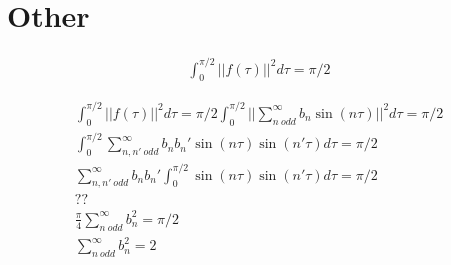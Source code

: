 
\section{Other}


\begin{gather}
    \int_0^{\pi/2} ||f(\tau) ||^2 d\tau = \pi/2
\end{gather}

\begin{gather}
    \int_0^{\pi/2} ||f(\tau) ||^2 d\tau = \pi/2
    \int_0^{\pi/2} || \sum_{n \ odd}^\infty b_n \sin(n\tau) ||^2 d\tau = \pi/2\\
    \int_0^{\pi/2}  \sum_{n,n' \ odd}^\infty b_n b_n' \sin(n\tau)\sin(n'\tau)  d\tau = \pi/2\\
    \sum_{n,n' \ odd}^\infty b_n b_n' \int_0^{\pi/2}\sin(n\tau)\sin(n'\tau)  d\tau = \pi/2 \\
    ?? \\
    \frac{\pi}{4} \sum_{n \ odd}^\infty b_n^2  = \pi/2 \\
    \sum_{n \ odd}^\infty b_n^2  = 2 
\end{gather}
